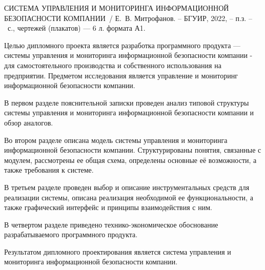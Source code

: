 \thispagestyle{empty}

СИСТЕМА УПРАВЛЕНИЯ И МОНИТОРИНГА ИНФОРМАЦИОННОЙ БЕЗОПАСНОСТИ КОМПАНИИ~/ Е.~В. Митрофанов. -- БГУИР, 2022, -- п.з. -- ~\pageref*{LastPage}с., чертежей (плакатов) --- 6 л. формата А1.

\vspace{4\parsep}


Целью дипломного проекта является разработка программного продукта --- системы управления и мониторинга информационной безопасности компании - для самостоятельного производства и собственного использования на предприятии. Предметом исследования является управление и мониторинг информационной безопасности компании.

В первом разделе пояснительной записки проведен анализ типовой структуры системы управления и мониторинга информационной безопасности компании и обзор аналогов.

Во втором разделе описана модель системы управления и мониторинга информационной безопасности компании. Структурированы понятия, связанные с модулем, рассмотрены ее общая схема, определены основные её возможности, а также требования к системе.


В третьем разделе проведен выбор и описание инструментальных средств для реализации системы, описана реализация необходимой ее функциональности, а также графический интерфейс и принципы взаимодействия с ним.

В четвертом разделе приведено технико-экономическое обоснование разрабатываемого программного продукта.

Результатом дипломного проектирования является система управления и мониторинга информационной безопасности компании.
\clearpage